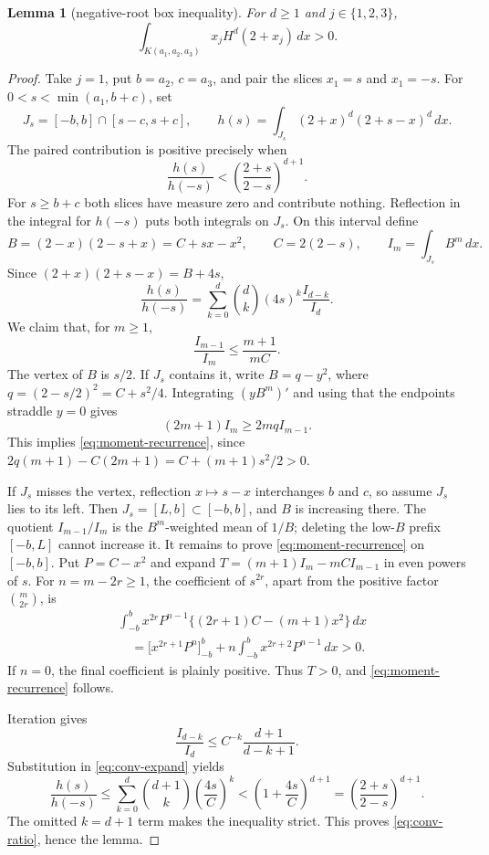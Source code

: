 \documentclass[11pt]{amsart}
\newtheorem{lemma}[theorem]{Lemma}
\theoremstyle{definition}
\theoremstyle{remark}
\begin{document}
\begin{lemma}[negative-root box inequality]\label{lem:negative-box}
For $d\ge1$ and $j\in\{1,2,3\}$,
\[
 \int_{K(a_1,a_2,a_3)}x_jH^d(2+x_j)\,dx>0.
\]
\end{lemma}

\begin{proof}
Take $j=1$, put $b=a_2$, $c=a_3$, and pair the slices $x_1=s$ and
$x_1=-s$. For $0<s<\min(a_1,b+c)$, set
\[
 J_s=[-b,b]\cap[s-c,s+c],\qquad
 h(s)=\int_{J_s}(2+x)^d(2+s-x)^d\,dx.
\]
The paired contribution is positive precisely when
\begin{equation}\label{eq:conv-ratio}
\frac{h(s)}{h(-s)}<\left(\frac{2+s}{2-s}\right)^{d+1}.
\end{equation}
For $s\ge b+c$ both slices have measure zero and contribute nothing.
Reflection in the integral for $h(-s)$ puts both integrals on $J_s$.
On this interval define
\[
 B=(2-x)(2-s+x)=C+sx-x^2,\qquad C=2(2-s),
 \qquad I_m=\int_{J_s}B^m\,dx.
\]
Since $(2+x)(2+s-x)=B+4s$,
\begin{equation}\label{eq:conv-expand}
 \frac{h(s)}{h(-s)}
 =\sum_{k=0}^d\binom dk(4s)^k\frac{I_{d-k}}{I_d}.
\end{equation}
We claim that, for $m\ge1$,
\begin{equation}\label{eq:moment-recurrence}
 \frac{I_{m-1}}{I_m}\le\frac{m+1}{mC}.
\end{equation}
The vertex of $B$ is $s/2$. If $J_s$ contains it, write
$B=q-y^2$, where $q=(2-s/2)^2=C+s^2/4$. Integrating $(yB^m)'$ and
using that the endpoints straddle $y=0$ gives
\[
 (2m+1)I_m\ge2mqI_{m-1}.
\]
This implies \eqref{eq:moment-recurrence}, since
$2q(m+1)-C(2m+1)=C+(m+1)s^2/2>0$.

If $J_s$ misses the vertex, reflection $x\mapsto s-x$ interchanges $b$
and $c$, so assume $J_s$ lies to its left. Then
$J_s=[L,b]\subset[-b,b]$, and $B$ is increasing there. The quotient
$I_{m-1}/I_m$ is the $B^m$-weighted mean of $1/B$; deleting the low-$B$
prefix $[-b,L]$ cannot increase it. It remains to prove
\eqref{eq:moment-recurrence} on $[-b,b]$. Put $P=C-x^2$ and expand
$T=(m+1)I_m-mCI_{m-1}$ in even powers of $s$. For $n=m-2r\ge1$, the
coefficient of $s^{2r}$, apart from the positive factor $\binom m{2r}$,
is
\[
 \begin{split}
 &\int_{-b}^b x^{2r}P^{n-1}\bigl\{(2r+1)C-(m+1)x^2\bigr\}\,dx\\
 &\quad=\bigl[x^{2r+1}P^n\bigr]_{-b}^b
   +n\int_{-b}^b x^{2r+2}P^{n-1}\,dx>0.
 \end{split}
\]
If $n=0$, the final coefficient is plainly positive. Thus $T>0$, and
\eqref{eq:moment-recurrence} follows.

Iteration gives
\[
 \frac{I_{d-k}}{I_d}\le C^{-k}\frac{d+1}{d-k+1}.
\]
Substitution in \eqref{eq:conv-expand} yields
\[
 \frac{h(s)}{h(-s)}
 \le\sum_{k=0}^d\binom{d+1}{k}\left(\frac{4s}{C}\right)^k
 <\left(1+\frac{4s}{C}\right)^{d+1}
 =\left(\frac{2+s}{2-s}\right)^{d+1}.
\]
The omitted $k=d+1$ term makes the inequality strict. This proves
\eqref{eq:conv-ratio}, hence the lemma.
\end{proof}
\end{document}
